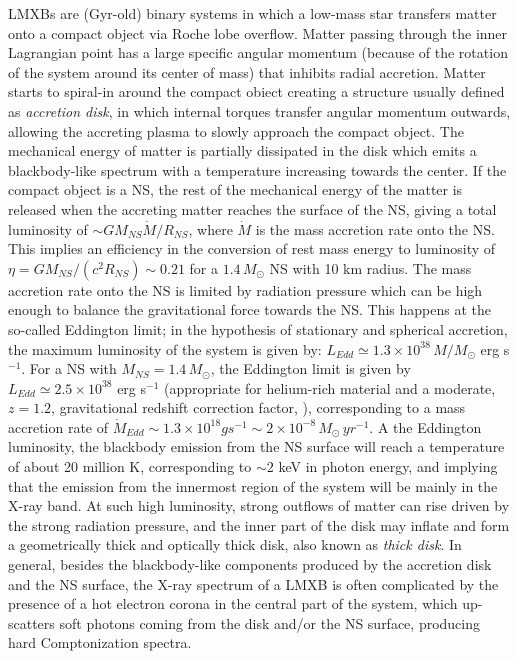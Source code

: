 \documentclass[graybox]{svmult}
\begin{document}
LMXBs are (Gyr-old) binary systems in which a low-mass star transfers matter onto a compact object via Roche lobe overflow. Matter passing through the inner Lagrangian point has a large specific angular momentum (because of the rotation of the system around its center of mass) that inhibits radial accretion. Matter starts to spiral-in around the compact obiect creating a structure usually defined as \textit{accretion disk}, in which internal torques transfer angular momentum outwards, allowing the accreting plasma to slowly approach the compact object. The mechanical energy of matter is partially dissipated in the disk which emits a blackbody-like spectrum with a temperature increasing towards the center. If the compact object is a NS, the rest of the mechanical energy of the matter is released when the accreting matter reaches the surface of the NS, giving a total luminosity of $\sim G M_{NS} \dot M / R_{NS}$, where $\dot M$ is the mass accretion rate onto the NS. This implies an efficiency in the conversion of rest mass energy to luminosity of $\eta = G M_{NS} / (c^2 R_{NS}) \sim 0.21$ for a $1.4\, M_\odot$ NS with 10 km radius. The mass accretion rate onto the NS is limited by radiation pressure which can be high enough to balance the gravitational force towards the NS. This happens at the so-called Eddington limit; in the hypothesis of stationary and spherical accretion, the maximum luminosity of the system is given by: $L_{Edd} \simeq 1.3 \times 10^{38}\, M/M_\odot$ erg s$^{-1}$.
For a NS with $M_{NS} = 1.4\, M_\odot$, the Eddington limit is given by $L_{Edd} \simeq 2.5 \times 10^{38}$ erg s$^{-1}$ (appropriate for helium-rich material and a moderate, $z=1.2$, gravitational redshift correction factor, \cite{vanParadijs1994}), corresponding to a mass accretion rate of $\dot M_{Edd} \sim 1.3 \times 10^{18} g s^{-1} \sim 2 \times 10^{-8}\, M_\odot\, yr^{-1}$. A the Eddington luminosity, the  blackbody emission from the NS surface will reach a temperature of about 20 million K, corresponding to $\sim 2$ keV in photon energy, and implying that the emission from the innermost region of the system will be mainly in the X-ray band. At such high luminosity, strong outflows of matter can rise driven by the strong radiation pressure, and the inner part of the disk may inflate and form a geometrically thick and optically thick disk, also known as {\it thick disk}. 
In general, besides the blackbody-like components produced by the accretion disk and the NS surface, the X-ray spectrum of a LMXB is often complicated by the presence of a hot electron corona in the central part of the system, which up-scatters soft photons coming from the disk and/or the NS surface, producing hard Comptonization spectra.
\end{document}
